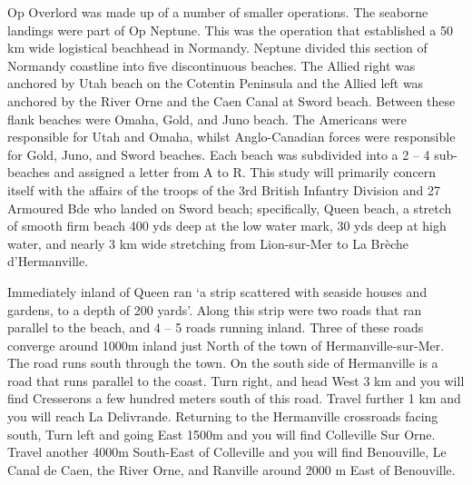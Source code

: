 \documentclass[noraggedright]{turabian-researchpaper}
\begin{document}

Op Overlord was made up of a number of smaller operations.  The seaborne
landings were part of Op Neptune.  This was the operation that established a
50 km wide logistical beachhead in Normandy.  Neptune divided this section of
Normandy coastline into five discontinuous beaches.  The Allied right was 
anchored by Utah beach on the Cotentin Peninsula and the Allied left was 
anchored by the River Orne and the Caen Canal at Sword beach.  Between
these flank beaches were Omaha, Gold, and Juno beach.  The Americans were 
responsible for Utah and Omaha, whilst Anglo-Canadian forces were responsible
for Gold, Juno, and Sword beaches.  Each beach was subdivided into a 2 -- 4
sub-beaches and assigned a letter from A to R.  This study will primarily 
concern itself with the affairs of the troops of the 3rd British Infantry 
Division and 27 Armoured Bde who landed on Sword beach; specifically, Queen 
beach, a stretch of smooth firm beach 400 yds deep at the low water mark,
30 yds deep at high water, and nearly 3 km wide stretching from Lion-sur-Mer 
to La Brèche d'Hermanville.%

Immediately inland of Queen ran `a strip scattered with seaside houses and
gardens, to a depth of 200 yards'.%
Along this strip were two roads that ran parallel to the beach, and 4 -- 5
roads running inland.  Three of these roads converge around 1000m inland just
North of the town of Hermanville-sur-Mer.  The road runs south through the 
town.  On the south side of Hermanville is a road that runs parallel to the
coast.  Turn right, and head West 3 km and you will find Cresserons a few
hundred meters south of this road.  Travel further 1 km and you will
reach La Delivrande.  Returning to the Hermanville crossroads facing south, 
Turn left and going East 1500m and you will find Colleville Sur Orne. Travel 
another 4000m South-East of Colleville and you will find Benouville, 
Le Canal de Caen, the River Orne, and Ranville around 2000 m East of 
Benouville.  
\end{document}
